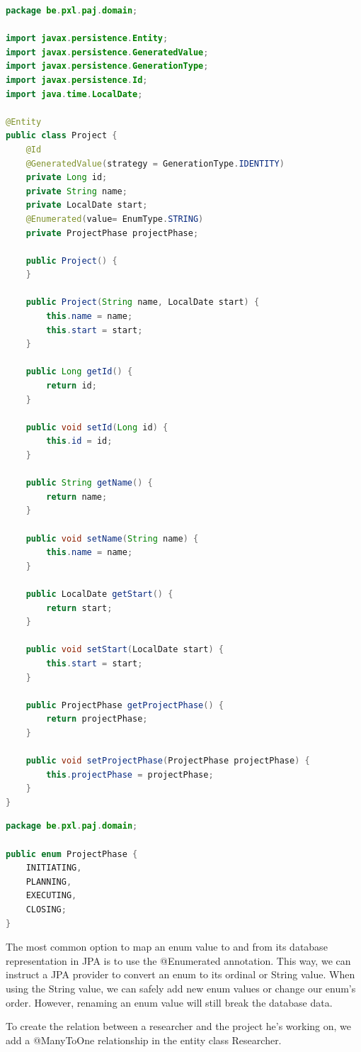 \begin{lstlisting}[frame=single, language=java]
package be.pxl.paj.domain;

import javax.persistence.Entity;
import javax.persistence.GeneratedValue;
import javax.persistence.GenerationType;
import javax.persistence.Id;
import java.time.LocalDate;

@Entity
public class Project {
	@Id
	@GeneratedValue(strategy = GenerationType.IDENTITY)
	private Long id;
	private String name;
	private LocalDate start;
	@Enumerated(value= EnumType.STRING)
	private ProjectPhase projectPhase;

	public Project() {
	}

	public Project(String name, LocalDate start) {
		this.name = name;
		this.start = start;
	}

	public Long getId() {
		return id;
	}

	public void setId(Long id) {
		this.id = id;
	}

	public String getName() {
		return name;
	}

	public void setName(String name) {
		this.name = name;
	}

	public LocalDate getStart() {
		return start;
	}

	public void setStart(LocalDate start) {
		this.start = start;
	}
	
	public ProjectPhase getProjectPhase() {
		return projectPhase;
	}

	public void setProjectPhase(ProjectPhase projectPhase) {
		this.projectPhase = projectPhase;
	}
}
\end{lstlisting}

\begin{lstlisting}[frame=single, language=java]
package be.pxl.paj.domain;

public enum ProjectPhase {
	INITIATING,
	PLANNING,
	EXECUTING,
	CLOSING;
}
\end{lstlisting}

The most common option to map an enum value to and from its database representation in JPA is to use the @Enumerated annotation. This way, we can instruct a JPA provider to convert an enum to its ordinal or String value.  When using the String value,  we can safely add new enum values or change our enum's order.  However, renaming an enum value will still break the database data.

To create the relation between a researcher and the project he's working on, we add a @ManyToOne relationship in the entity class Researcher.

